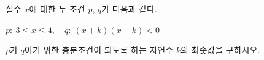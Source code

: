 실수 $x$에 대한 두 조건 $p$, $q$가 다음과 같다. \begin{center}$p:\ 3\le x\le 4,\quad q:\ (x+k)(x-k)<0$\end{center} $p$가 $q$이기 위한 충분조건이 되도록 하는 자연수 $k$의 최솟값을 구하시오.
